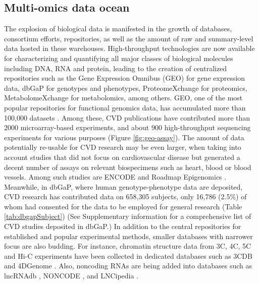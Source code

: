 \documentclass[letter]{bioinfo}
\begin{document}
	\subsection*{Multi-omics data ocean}
    The explosion of biological data is manifested in the growth of databases, consortium efforts, repositories, as well as the amount of raw and summary-level data hosted in these warehouses. High-throughput technologies are now available for characterizing and quantifying all major classes of biological molecules including DNA, RNA and protein, leading to the creation of centralized repositories such as the Gene Expression Omnibus (GEO) \citep{Barrett:2013:NCBI} for gene expression data, dbGaP \citep{Tryka:2014:dbGaP} for genotypes and phenotypes, ProteomeXchange \citep{Vizcaino:2014:ProteomeXchange,Deutsch:2017:ProteomeXchange} for proteomics, MetabolomeXchange for metabolomics, among others.  GEO, one of the most popular repositories for functional genomics data, has accumulated more than 100,000 datasets \citep{Zhu:2008:GEOmetadb}. Among these, CVD publications have contributed more than 2000 microarray-based experiments, and about 900 high-throughput sequencing experiments for various purposes (Figure \ref{fig:geo-assay}). The amount of data potentially re-usable for CVD research may be even larger, when taking into account studies that did not focus on cardiovascular disease but generated a decent number of assays on relevant biospecimens such as heart, blood or blood vessels. Among such studies are ENCODE \citep{ENCODE:2012:integrated} and Roadmap Epigenomics \citep{Roadmap:2015:Integrative}.
	Meanwhile, in dbGaP, where human genotype-phenotype data are deposited, CVD research has contributed data on 658,305 subjects, only 16,786 (2.5\%) of whom had consented for the data to be employed for general research (Table \ref{tab:dbgapSubject}) (See Supplementary information for a comprehensive list of CVD studies deposited in dbGaP.)
	In addition to the central repositories for established and popular experimental methods, smaller databases with narrower focus are also budding. For instance, chromatin structure data from 3C, 4C, 5C and Hi-C experiments have been collected in dedicated databases such as 3CDB \citep{Yun:2016:3CDB} and 4DGenome \citep{Teng:2015:4DGenome}. Also, noncoding RNAs are being added into databases such as lncRNAdb \citep{Quek:2015:lncRNAdb}, NONCODE \citep{Fang:2018:NONCODEV5}, and LNCipedia \citep{Volders:2018:LNCipedia}.
	
\end{document}
